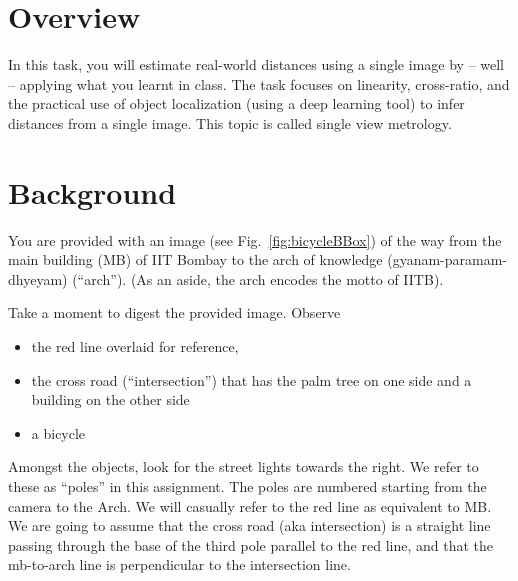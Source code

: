 
\section{Overview}

In this task, you will estimate real-world distances using a single
image by -- well -- applying what you learnt in class.
The task
focuses on  linearity, cross-ratio, and the practical use
of object localization (using a  deep learning tool) to infer
distances from a single image.
This topic is called single view metrology.

\section{Background}

You are provided with an image (see Fig.~\ref{fig:bicycleBBox}) of
the way from the main building
(MB) of IIT Bombay to the arch of knowledge (gyanam-paramam-dhyeyam) (``arch'').
(As an aside, the arch encodes the motto of IITB).

Take a moment to digest the provided image.
Observe
\begin{itemize} 
\item the red line overlaid for reference, 
\item the cross road (``intersection'') that has the palm tree on one side and a building
on the other side
\item a bicycle
\end{itemize}

Amongst the  objects, look for the street lights  towards the right.
We refer to these as 
``poles'' in this assignment. The poles are numbered starting from the camera to the Arch.
We will casually refer to the red line as equivalent to MB.
We are
going to assume that the cross road (aka intersection)  is a straight line passing
through the base of the third pole parallel to the red
line, and that the mb-to-arch line is perpendicular to
the intersection line.


